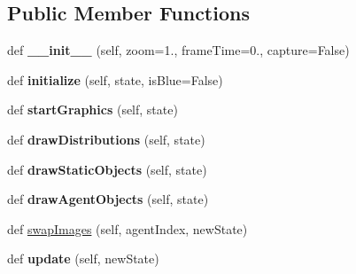 \subsection*{Public Member Functions}
\begin{DoxyCompactItemize}
\item 
\mbox{\label{classgraphics_display_1_1_pacman_graphics_a1f2ff5e46ad9142e430d1db50dc62fb3}} 
def {\bfseries \+\_\+\+\_\+init\+\_\+\+\_\+} (self, zoom=1., frame\+Time=0., capture=False)
\item 
\mbox{\label{classgraphics_display_1_1_pacman_graphics_a2d797692da8672d6dbbf90686dc9d33c}} 
def {\bfseries initialize} (self, state, is\+Blue=False)
\item 
\mbox{\label{classgraphics_display_1_1_pacman_graphics_a757ee12fb854deed038d1c8805c1173d}} 
def {\bfseries start\+Graphics} (self, state)
\item 
\mbox{\label{classgraphics_display_1_1_pacman_graphics_af9909fdb51aed076e63cc8e52e125f3c}} 
def {\bfseries draw\+Distributions} (self, state)
\item 
\mbox{\label{classgraphics_display_1_1_pacman_graphics_a7cc7858ce3f72db75ffbb9bc3652578c}} 
def {\bfseries draw\+Static\+Objects} (self, state)
\item 
\mbox{\label{classgraphics_display_1_1_pacman_graphics_a8c3b8f95c2ea4a9c497bc6bfe7d0368a}} 
def {\bfseries draw\+Agent\+Objects} (self, state)
\item 
def \hyperlink{classgraphics_display_1_1_pacman_graphics_afa38cdde4141fb7f84b80983404f6ab0}{swap\+Images} (self, agent\+Index, new\+State)
\item 
\mbox{\label{classgraphics_display_1_1_pacman_graphics_ad2344cf277b2d71ab9da78bdeecd489b}} 
def {\bfseries update} (self, new\+State)
\item 
\mbox{\label{classgraphics_display_1_1_pacman_graphics_a36fbd919ef70248db977e693074ed848}} 

\end{DoxyCompactItemize}
